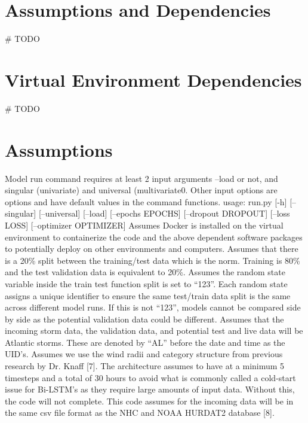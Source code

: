\documentclass{article}
\begin{document}
\section{Assumptions and Dependencies}
\# TODO
\section{Virtual Environment Dependencies}
\# TODO

\section{Assumptions}
Model run command requires at least 2 input arguments –load or not, and singular (univariate) and universal (multivariate0. Other input options are options and have default values in the command functions.
usage: run.py [-h] [--singular] [--universal] [--load] [--epochs EPOCHS] [--dropout DROPOUT] [--loss LOSS] [--optimizer OPTIMIZER]
Assumes Docker is installed on the virtual environment to containerize the code and the above dependent software packages to potentially deploy on other environments and computers.
Assumes that there is a 20\% split between the training/test data which is the norm.
Training is 80\% and the test validation data is equivalent to 20\%.
Assumes the random state variable inside the train test function split is set to “123”. 
Each random state assigns a unique identifier to ensure the same test/train data split is the same across different model runs. If this is not “123”, models cannot be compared side by side as the potential validation data could be different. 
Assumes that the incoming storm data, the validation data, and potential test and live data will be Atlantic storms. These are denoted by “AL” before the date and time as the UID’s.
Assumes we use the wind radii and category structure from previous research by Dr. Knaff [7]. %
The architecture assumes to have at a minimum 5 timesteps and a total of 30 hours to avoid what is commonly called a cold-start issue for Bi-LSTM’s as they require large amounts of input data. Without this, the code will not complete.
This code assumes for the incoming data will be in the same csv file format as the NHC and NOAA HURDAT2 database [8]. %
\end{document}
